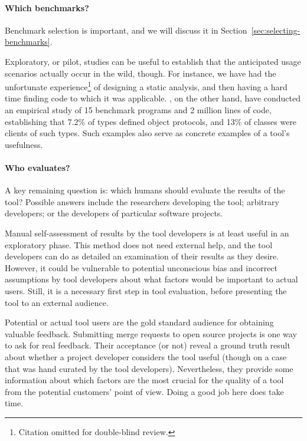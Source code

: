 \paragraph{Which benchmarks?} Benchmark selection is important,
and we will discuss it in Section~\ref{sec:selecting-benchmarks}.

Exploratory, 
or pilot, studies can be useful to establish that the
anticipated usage scenarios actually occur in the wild, though. For instance,
we have had the unfortunate experience\footnote{Citation omitted for double-blind review.} of designing a static analysis,
and then having a hard time finding code to which it was
applicable. \cite{beckman11:_empir_study_objec_protoc_wild}, on the
other hand, have conducted an empirical study of 15 benchmark programs
and 2 million lines of code, establishing that 7.2\% of types defined
object protocols, and 13\% of classes were clients of such types.
Such examples also serve as concrete examples of a tool's usefulness.


\paragraph{Who evaluates?}
A key remaining question is: which humans should evaluate the
results of the tool?  Possible answers include the researchers
developing the tool; arbitrary developers; or the developers of
particular software projects.

Manual self-assessment of results by the tool developers is at least
useful in an exploratory phase. This method does not need external
help, and the tool developers can do as detailed an examination of
their results as they desire. However, it could be vulnerable to
potential unconscious bias and incorrect assumptions by tool
developers about what factors would be important to actual
users. Still, it is a necessary first step in tool evaluation, before
presenting the tool to an external audience.

Potential or actual tool users are the gold standard audience for
obtaining valuable feedback. Submitting merge requests to open source
projects is one way to ask for real feedback. Their acceptance (or
not) reveal a ground truth result about whether a project developer
considers the tool useful (though on a case that was hand curated by
the tool developers). Nevertheless, they provide some information
about which factors are the most crucial for the quality of a tool
from the potential customers' point of view. Doing a good job here
does take time.


